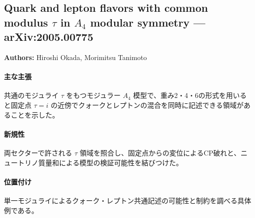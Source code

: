 \subsection{Quark and lepton flavors with common modulus $\tau$ in $A_4$ modular symmetry --- arXiv:2005.00775}

\textbf{Authors:} Hiroshi Okada, Morimitsu Tanimoto

\paragraph{主な主張}
共通のモジュライ $\tau$ をもつモジュラー $A_4$ 模型で、重み2・4・6の形式を用いると固定点 $\tau=i$ の近傍でクォークとレプトンの混合を同時に記述できる領域があることを示した\cite{Okada:2020rjb}。

\paragraph{新規性}
両セクターで許される $\tau$ 領域を照合し、固定点からの変位によるCP破れと、ニュートリノ質量和による模型の検証可能性を結びつけた。

\paragraph{位置付け}
単一モジュライによるクォーク・レプトン共通記述の可能性と制約を調べる具体例である。
